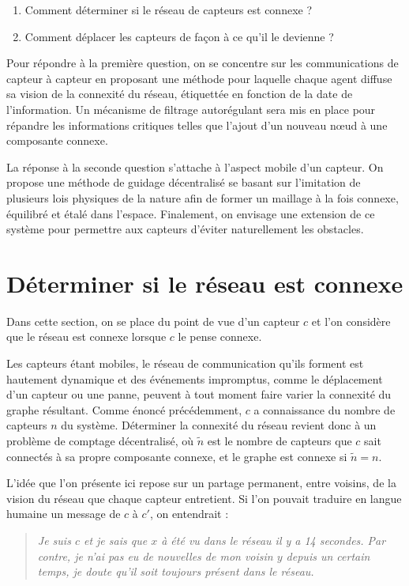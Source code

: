 \documentclass[10pt]{article}
\begin{document}
\begin{multicols}{2}
\begin{enumerate}
\item{Comment déterminer si le réseau de capteurs est connexe ?}
\item{Comment déplacer les capteurs de façon à ce qu'il le devienne ?}
\end{enumerate}

Pour répondre à la première question, on se concentre sur les
communications de capteur à capteur en proposant une méthode pour
laquelle chaque agent diffuse sa vision de la connexité du réseau,
étiquettée en fonction de la date de l'information. Un mécanisme de
filtrage autorégulant sera mis en place pour répandre les informations
critiques telles que l'ajout d'un nouveau n\oe ud à une composante
connexe.

La réponse à la seconde question s'attache à l'aspect mobile d'un
capteur. On propose une méthode de guidage décentralisé se basant sur
l'imitation de plusieurs lois physiques de la nature afin de former un
maillage à la fois connexe, équilibré et étalé dans
l'espace. Finalement, on envisage une extension de ce système pour
permettre aux capteurs d'éviter naturellement les obstacles.

\section{Déterminer si le réseau est connexe}

Dans cette section, on se place du point de vue d'un capteur $c$ et
l'on considère que le réseau est connexe lorsque $c$ le pense connexe.

Les capteurs étant mobiles, le réseau de communication qu'ils forment
est hautement dynamique et des événements impromptus, comme le
déplacement d'un capteur ou une panne, peuvent à tout moment faire
varier la connexité du graphe résultant. Comme énoncé précédemment,
$c$ a connaissance du nombre de capteurs $n$ du système. Déterminer la
connexité du réseau revient donc à un problème de comptage
décentralisé, o\`u $\tilde{n}$ est le nombre de capteurs que $c$ sait
connectés à sa propre composante connexe, et le graphe est connexe si
$\tilde{n} = n$.

L'idée que l'on présente ici repose sur un partage permanent, entre
voisins, de la vision du réseau que chaque capteur entretient. Si l'on
pouvait traduire en langue humaine un message de $c$ à $c'$, on
entendrait :

\begin{quote}
  \textit{Je suis $c$ et je sais que $x$ à été vu dans le réseau il y
    a 14 secondes. Par contre, je n'ai pas eu de nouvelles de mon
    voisin $y$ depuis un certain temps, je doute qu'il soit toujours
    présent dans le réseau.}
\end{quote}


\end{multicols}
\end{document}
